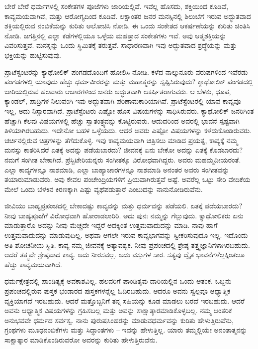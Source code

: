 ಬೇರೆ ಬೇರೆ ಧರ್ಮಗಳಲ್ಲಿ ಸಂಕೇತಗಳ ಪೂಜೆಗಳು ಜಾರಿಯಲ್ಲಿವೆ. ಇವೆಲ್ಲ ಹೊಸದು, ಶಕ್ತಿಯಿಂದ ಕೂಡಿವೆ, ಕಾವ್ಯಮಯವಾಗಿವೆ, ಮತ್ತು ಆರೋಗ್ಯದಿಂದ ಕೂಡಿವೆ. ಲಕ್ಷಾಂತರ ಜನರ ಮನಸ್ಸಿನಲ್ಲಿ ಶಿಲುಬೆಗೆ ಇರುವ ಅದ್ಭುತವಾದ ಶಕ್ತಿಯಲ್ಲಿರುವ ನಂಬಿಕೆಯನ್ನು ಕುರಿತು ಆಲೋಚಿಸಿ ನೋಡಿ. ಈ ಒಂದು ಸಂಕೇತದ ಆಕರ್ಷಣೆಯನ್ನು ಕುರಿತು ಚಿಂತಿಸಿ ನೋಡಿ. ಜಗತ್ತಿನಲ್ಲಿ ಎಲ್ಲಾ ಕಡೆಗಳಲ್ಲಿಯೂ ಒಳ್ಳೆಯ ಮಹತ್ತಾದ ಸಂಕೇತಗಳು ಇವೆ. ಅವು ಆತ್ಮಶಕ್ತಿಯನ್ನು ವಿವರಿಸುತ್ತವೆ. ಮನಸ್ಸನ್ನು ಒಂದು ಸ್ಥಿಮಿತಕ್ಕೆ ತರುತ್ತವೆ. ಸಾಧಾರಣವಾಗಿ ಇವು ಅದ್ಭುತವಾದ ಶ್ರದ್ಧೆಯನ್ನು ಮತ್ತು ಭಕ್ತಿಯನ್ನು ಹುಟ್ಟಿಸುವುವು.

\newpage

ಪ್ರಾಟೆಸ್ಟಂಟರನ್ನು ಕ್ಯಾಥೋಲಿಕ್ ಪಂಗಡದೊಂದಿಗೆ ಹೋಲಿಸಿ ನೋಡಿ. ಕಳೆದ ನಾಲ್ಕುನೂರು ವರುಷಗಳಿಂದ ಇವೆರಡು ಪಂಗಡಗಳಲ್ಲಿ ಯಾವುದು ಹೆಚ್ಚು ಧರ್ಮವೀರರನ್ನು ಮತ್ತು ಮಹಾತ್ಮರನ್ನು ಸೃಷ್ಟಿಸಿರುವುದು? ಕ್ಯಾಥೋಲಿಕ್ ಪಂಗಡದಲ್ಲಿ ಜಾರಿಯಲ್ಲಿರುವ ಹಲವಾರು ಆಚಾರಗಳಿಂದ ಜನರು ಅದ್ಭುತವಾಗಿ ಆಕರ್ಷಿತರಾಗುವರು. ಆ ಬೆಳಕು, ಧೂಪ, ಕ್ಯಾಂಡಲ್, ಪಾದ್ರಿಗಳ ನಿಲುವಂಗಿ ಇವು ಅದ್ಭುತವಾಗಿ ಪರಿಣಾಮಕಾರಿಯಾಗಿವೆ. ಪ್ರಾಟೆಸ್ಟೆಂಟರಲ್ಲಿ ಯಾವ ಕಾವ್ಯವೂ ಇಲ್ಲ, ಅದು ನಿಸ್ಸಾರವಾಗಿದೆ. ಪ್ರಾಟೆಸ್ಟೆಂಟರು ಎಷ್ಟೋ ಹೊಸ ವಿಷಯಗಳನ್ನು ಸಾಧಿಸಿರುವರು. ಕ್ಯಾಥೋಲಿಕ್ ಜನರಿಗಿಂತ ಹೆಚ್ಚಾಗಿ ಕೆಲವು ವಿಷಯಗಳಲ್ಲಿ ಹೆಚ್ಚು ಸ್ವಾತಂತ್ರ್ಯವನ್ನು ಕೊಟ್ಟಿರುವರು. ಆದುದರಿಂದ ಅವರಲ್ಲಿ ಭಾವನೆ ಸ್ಪಷ್ಟವಾಗಿ ತಿಳಿಯಾಗಿರಬಹುದು. ಇದೇನೋ ಬಹಳ ಒಳ್ಳೆಯದು. ಆದರೆ ಅವರು ಎಷ್ಟೋ ವಿಷಯಗಳನ್ನು ಕಳೆದುಕೊಂಡಿರುವರು. ಚರ್ಚಿನಲ್ಲಿರುವ ಚಿತ್ರಗಳನ್ನು ತೆಗೆದುಕೊಳ್ಳಿ. ಇವು ಕಾವ್ಯಮಯವಾಗಿ ಚಿತ್ರಿಸಲು ಮಾಡಿದ ಪ್ರಯತ್ನ, ಕಾವ್ಯಕ್ಕೆ ನಮ್ಮ ಮನಸ್ಸು ಕಾತರಿಸಿದರೆ ಏತಕ್ಕೆ ಅದನ್ನು ಪಡೆಯಬಾರದು? ಜೀವನಕ್ಕೆ ಏನು ಬೇಕೋ ಅದನ್ನು ಏತಕ್ಕೆ ಕೊಡಬಾರದು? ನಮಗೆ ಸಂಗೀತ ಬೇಕಾಗಿದೆ. ಪ್ರೆಸ್ಬಿಟೇರಿಯನ್ನರು ಸಂಗೀತಕ್ಕೂ ವಿರೋಧವಾಗಿದ್ದರು. ಅವರು ಮಹಮ್ಮದೀಯರಂತೆ. ಎಲ್ಲಾ ಕಾವ್ಯಗಳನ್ನೂ ನಾಶಮಾಡಿ, ಎಲ್ಲಾ ಬಾಹ್ಯಾಚಾರಗಳನ್ನೂ ನಾಶಮಾಡಿ ಅನಂತರ ಅವರು ಸಂಗೀತವನ್ನು ತಯಾರುಮಾಡುವರು. ಅವು ಕೇವಲ ಪಂಚೇಂದ್ರಿಯಗಳಿಗೆ ಪ್ರಿಯವಾಗಿರುತ್ತವೆ ಅಷ್ಟೆ. ಅವರೆಲ್ಲ ಒಟ್ಟು ಸೇರಿ ವೇದಿಕೆಯ ಮೇಲೆ ಒಂದು ಬೆಳಕಿನ ಕಿರಣಕ್ಕಾಗಿ ಎಷ್ಟು ವ್ಯಥೆಪಡುತ್ತಾರೆ ಎಂಬುದನ್ನು ನಾನು\break ನೋಡಿರುವೆನು.

ಜೀವಿಯು ಬಾಹ್ಯಪ್ರಪಂಚದಲ್ಲಿ ಬೇಕಾದಷ್ಟು ಕಾವ್ಯವನ್ನು ಮತ್ತು ಧರ್ಮವನ್ನು ಪಡೆಯಲಿ. ಏತಕ್ಕೆ ಪಡೆಯಬಾರದು? ನೀವು ಬಾಹ್ಯಪೂಜೆಗೆ ವಿರೋಧವಾಗಿ ಹೋರಾಡಲಾರಿರಿ. ಅದು ಪುನಃ ನಮ್ಮನ್ನು ಗೆಲ್ಲುವುದು. ಕ್ಯಾಥೋಲಿಕರು ಏನು ಮಾಡುತ್ತಾರೊ ಅದನ್ನು ನೀವು ಮೆಚ್ಚದೇ ಇದ್ದರೆ ಅದಕ್ಕಿಂತ ಉತ್ತಮವಾದುದನ್ನು ಮಾಡಿ. ನಾವು ಹಾಗೆ ಉತ್ತಮವಾದುದನ್ನು ಮಾಡುವುದಿಲ್ಲ. ಅಥವಾ ಆಗಲೇ ಇರುವ ಕಾವ್ಯಭಾಗವನ್ನು ಸ್ವೀಕರಿಸುವುದೂ ಇಲ್ಲ. ಇದೊಂದು ಅತಿ ಶೋಚನೀಯ ಸ್ಥಿತಿ. ಕಾವ್ಯ ನಮ್ಮ ಜೀವನಕ್ಕೆ ಅತ್ಯಾವಶ್ಯಕ. ನೀವು ಪ್ರಪಂಚದಲ್ಲಿ ಶ್ರೇಷ್ಠ ತತ್ತ್ವಜ್ಞಾನಿಗಳಾಗಿರಬಹುದು. ಆದರೆ ತತ್ತ್ವವೇ ಶ್ರೇಷ್ಠವಾದ ಕಾವ್ಯ. ಅದು ನೀರಸವಲ್ಲ. ಅದು ವಸ್ತುಗಳ ಸಾರ. ಸತ್ಯವು ದ್ವೈತ ಭಾವನೆಗಳೆಲ್ಲಕ್ಕಿಂತಲೂ ಹೆಚ್ಚು ಕಾವ್ಯಮಯವಾಗಿದೆ.

ಧರ್ಮಕ್ಷೇತ್ರದಲ್ಲಿ ಪಾಂಡಿತ್ಯಕ್ಕೆ ಅವಕಾಶವಿಲ್ಲ. ಹಲವರಿಗೆ ಪಾಂಡಿತ್ಯವು ದಾರಿಯಲ್ಲಿನ ಒಂದು ಆತಂಕ. ಒಬ್ಬನು ಪ್ರಪಂಚದಲ್ಲಿರುವ ಪುಸ್ತಕ ಭಂಡಾರದ ಪುಸ್ತಕಗಳನ್ನೆಲ್ಲ ಓದಿರಬಹುದು. ಆದರೂ ಅವನು ಸ್ವಲ್ಪವೂ ಆಧ್ಯಾತ್ಮಿಕ ವ್ಯಕ್ತಿಯಾಗದೆ ಇರಬಹುದು. ಆದರೆ ಮತ್ತೊಬ್ಬನಿಗೆ ತನ್ನ ಸಹಿಯನ್ನು ಕೂಡ ಮಾಡಲು ಬರದೆ ಇರಬಹುದು. ಆದರೆ ಅವನು ಆಧ್ಯಾತ್ಮಿಕ ವಿಷಯಗಳನ್ನು ಗ್ರಹಿಸಬಲ್ಲ ಮತ್ತು ಅವನ್ನು ಸಾಕ್ಷಾತ್ಕಾರಮಾಡಿಕೊಳ್ಳಬಲ್ಲ. ನಮ್ಮ ಆಂತರಿಕ ಅನುಭವವೇ ಧರ್ಮದ ಸರ್ವಸ್ವ. ನಾನು ಪುರುಷಸಿಂಹರನ್ನು ಮಾಡುವ\break ಧರ್ಮವನ್ನು ಕುರಿತು ಹೇಳುತ್ತಿರುವೆನು, ಗ್ರಂಥಗಳು ಮೂಢನಂಬಿಕೆಗಳು ಮತ್ತು ಸಿದ್ಧಾಂತಗಳು – ಇವನ್ನು ಹೇಳುತ್ತಿಲ್ಲ. ಯಾರು ತಮ್ಮಲ್ಲಿಯೇ ಅನಂತಾತ್ಮನನ್ನು ಸಾಕ್ಷಾತ್ಕಾರ ಮಾಡಿಕೊಂಡಿರುವರೋ ಅವರನ್ನು ಕುರಿತು ಹೇಳುತ್ತಿರುವೆನು.

